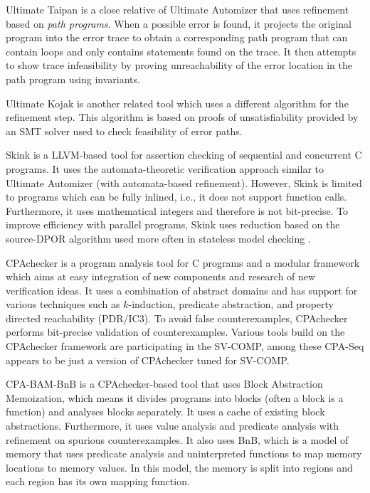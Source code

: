 Ultimate Taipan  is a close relative of Ultimate Automizer that uses refinement based on \emph{path programs}.
When a possible error is found, it projects the original program into the error trace to obtain a corresponding path program that can contain loops and only contains statements found on the trace.
It then attempts to show trace infeasibility by proving unreachability of the error location in the path program using invariants.

Ultimate Kojak  is another related tool which uses a different algorithm for the refinement step.
This algorithm is based on proofs of unsatisfiability provided by an SMT solver used to check feasibility of error paths.

Skink  is a LLVM-based tool for assertion checking of sequential and concurrent C programs.
It uses the automata-theoretic verification approach similar to Ultimate Automizer (with automata-based refinement).
However, Skink is limited to programs which can be fully inlined, i.e., it does not support function calls.
Furthermore, it uses mathematical integers and therefore is not bit-precise.
To improve efficiency with parallel programs, Skink uses reduction based on the source-DPOR algorithm used more often in stateless model checking .

CPAchecker  is a program analysis tool for C programs and a modular framework which aims at easy integration of new components and research of new verification ideas.
It uses a combination of abstract domains and has support for various techniques such as $k$-induction, predicate abstraction, and property directed reachability (PDR/IC3).
To avoid false counterexamples, CPAchecker performs bit-precise validation of counterexamples.
Various tools build on the CPAchecker framework are participating in the SV-COMP, among these CPA-Seq appears to be just a version of CPAchecker tuned for SV-COMP.

CPA-BAM-BnB  is a CPAchecker-based tool that uses Block Abstraction Memoization, which means it divides programs into blocks (often a block is a function) and analyses blocks separately.
It uses a cache of existing block abstractions.
Furthermore, it uses value analysis and predicate analysis with refinement on spurious counterexamples.
It also uses BnB, which is a model of memory that uses predicate analysis and uninterpreted functions to map memory locations to memory values.
In this model, the memory is split into regions and each region has its own mapping function.

